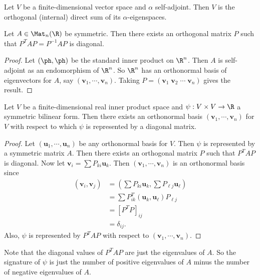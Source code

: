 \documentclass[a4paper]{article}
\begin{document}
\begin{cor}
  Let $V$ be a finite-dimensional vector space and $\alpha$ self-adjoint. Then $V$ is the orthogonal (internal) direct sum of its $\alpha$-eigenspaces.
\end{cor}

\begin{cor}
  Let $A \in \Mat_n(\R)$ be symmetric. Then there exists an orthogonal matrix $P$ such that $P^TAP = P^{-1}AP$ is diagonal.
\end{cor}

\begin{proof}
  Let $(\ph, \ph)$ be the standard inner product on $\R^n$. Then $A$ is self-adjoint as an endomorphism of $\R^n$. So $\R^n$ has an orthonormal basis of eigenvectors for $A$, say $(\mathbf{v}_1, \cdots, \mathbf{v}_n)$. Taking $P = (\mathbf{v}_1\; \mathbf{v}_2\; \cdots \; \mathbf{v}_n)$ gives the result.
\end{proof}

\begin{cor}
  Let $V$ be a finite-dimensional real inner product space and $\psi: V\times V \to \R$ a symmetric bilinear form. Then there exists an orthonormal basis $(\mathbf{v}_1, \cdots, \mathbf{v}_n)$ for $V$ with respect to which $\psi$ is represented by a diagonal matrix.
\end{cor}

\begin{proof}
  Let $(\mathbf{u}_1, \cdots, \mathbf{u}_n)$ be any orthonormal basis for $V$. Then $\psi$ is represented by a symmetric matrix $A$. Then there exists an orthogonal matrix $P$ such that $P^T AP$ is diagonal. Now let $\mathbf{v}_i = \sum P_{ki} \mathbf{u}_k$. Then $(\mathbf{v}_1, \cdots, \mathbf{v}_n)$ is an orthonormal basis since
  \begin{align*}
    (\mathbf{v}_i, \mathbf{v}_j) &= \left(\sum P_{ki} \mathbf{u}_k, \sum P_{\ell j} \mathbf{u}_\ell\right) \\
    &= \sum P_{ik}^T (\mathbf{u}_k, \mathbf{u}_\ell) P_{\ell j}\\
    &= [P^T P]_{ij}\\
    &= \delta_{ij}.
  \end{align*}
  Also, $\psi$ is represented by $P^T AP$ with respect to $(\mathbf{v}_1, \cdots, \mathbf{v}_n)$.
\end{proof}
Note that the diagonal values of $P^T AP$ are just the eigenvalues of $A$. So the signature of $\psi$ is just the number of positive eigenvalues of $A$ minus the number of negative eigenvalues of $A$.
\end{document}
